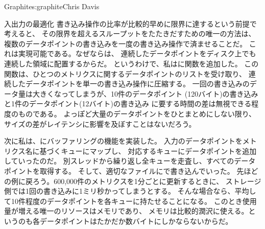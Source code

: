 \begin{aosachapter}{Graphite}{s:graphite}{Chris Davis}
\begin{aosasect1}{入出力の最適化}
書き込み操作の比率が比較的早めに限界に達するという前提で考えると、
その限界を超えるスループットをたたきだすための唯一の方法は、
複数のデータポイントの書き込みを一度の書き込み操作で済ませることだ。
これは実現可能である。なぜならは、
連続したデータポイントをディスク上でも連続した領域に配置するからだ。
というわけで、私はに関数を追加した。
この関数は、ひとつのメトリクスに関するデータポイントのリストを受け取り、
連続したデータポイントを単一の書き込み操作に圧縮する。
一回の書き込みのデータ量は大きくなってしまうが、10件のデータポイント
(120バイト)の書き込みと1件のデータポイント(12バイト)の書き込み
に要する時間の差は無視できる程度のものである。
よっぽど大量のデータポイントをひとまとめにしない限り、
サイズの差がレイテンシに影響を及ぼすことはないだろう。

次に私は、にバッファリングの機能を実装した。
入力のデータポイントをメトリクス名に基づくキューにマップし、
対応するキューにデータポイントを追加していったのだ。
別スレッドから繰り返し全キューを走査し、すべてのデータポイントを取得する。
そして、適切なファイルにで書き込んでいった。
先ほどの例に戻ろう。600,000件のメトリクスを1分ごとに更新するときに、
ストレージ側では1回の書き込みに1ミリ秒かってしまうとする。
そんな場合なら、平均して10件程度のデータポイントを各キューに持たせることになる。
このとき使用量が増える唯一のリソースはメモリであり、
メモリは比較的潤沢に使える。というのも各データポイントはたかだか数バイトにしかならないからだ。


\end{aosasect1}
\end{aosachapter}
